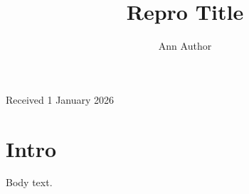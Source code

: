 \documentclass{article}
\title{Repro Title}\author{Ann Author}\affiliations{University of Witness}
\makeatletter
\def\maketitle{\par\begingroup\@maketitle\endgroup}
\def\@maketitle{{\LARGE\@title\par}{\large\@author\par}{\affiliations_\par}%
  \begin{abstract}\abs@text\end{abstract}%
  {\small Received 1 January 2026\par}}
\makeatother
\begin{document}
\maketitle
\section{Intro}Body text.
\end{document}
